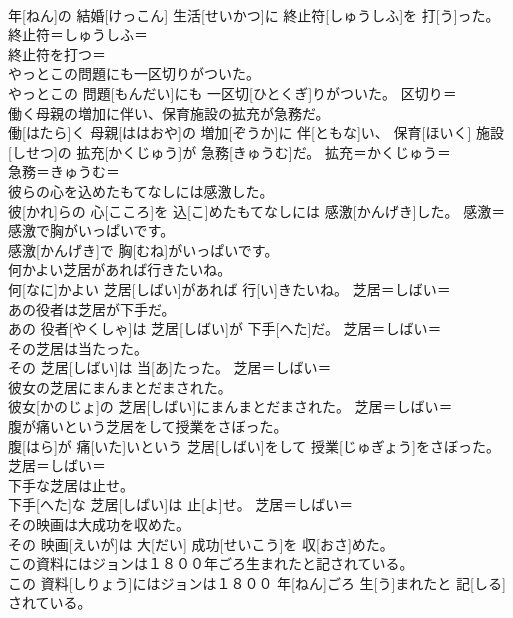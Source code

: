 \documentclass[8pt]{extreport}
\begin{document}
\begin{CJK}{UTF8}{min}
\\	年[ねん]の 結婚[けっこん] 生活[せいかつ]に 終止符[しゅうしふ]を 打[う]った。	終止符＝しゅうしふ＝ 
\\	終止符を打つ＝ 
\\	やっとこの問題にも一区切りがついた。	
\\	やっとこの 問題[もんだい]にも 一区切[ひとくぎ]りがついた。	区切り＝ 
\\	働く母親の増加に伴い、保育施設の拡充が急務だ。	
\\	働[はたら]く 母親[ははおや]の 増加[ぞうか]に 伴[ともな]い、 保育[ほいく] 施設[しせつ]の 拡充[かくじゅう]が 急務[きゅうむ]だ。	拡充＝かくじゅう＝ 
\\	急務＝きゅうむ＝ 
\\	彼らの心を込めたもてなしには感激した。	
\\	彼[かれ]らの 心[こころ]を 込[こ]めたもてなしには 感激[かんげき]した。	感激＝ 
\\	感激で胸がいっぱいです。	
\\	感激[かんげき]で 胸[むね]がいっぱいです。	
\\	何かよい芝居があれば行きたいね。	
\\	何[なに]かよい 芝居[しばい]があれば 行[い]きたいね。	芝居＝しばい＝ 
\\	あの役者は芝居が下手だ。	
\\	あの 役者[やくしゃ]は 芝居[しばい]が 下手[へた]だ。	芝居＝しばい＝ 
\\	その芝居は当たった。	
\\	その 芝居[しばい]は 当[あ]たった。	芝居＝しばい＝ 
\\	彼女の芝居にまんまとだまされた。	
\\	彼女[かのじょ]の 芝居[しばい]にまんまとだまされた。	芝居＝しばい＝ 
\\	腹が痛いという芝居をして授業をさぼった。	
\\	腹[はら]が 痛[いた]いという 芝居[しばい]をして 授業[じゅぎょう]をさぼった。	芝居＝しばい＝ 
\\	下手な芝居は止せ。	
\\	下手[へた]な 芝居[しばい]は 止[よ]せ。	芝居＝しばい＝ 
\\	その映画は大成功を収めた。	
\\	その 映画[えいが]は 大[だい] 成功[せいこう]を 収[おさ]めた。	
\\	この資料にはジョンは１８００年ごろ生まれたと記されている。	
\\	この 資料[しりょう]にはジョンは１８００ 年[ねん]ごろ 生[う]まれたと 記[しる]されている。	

\end{CJK}
\end{document}
